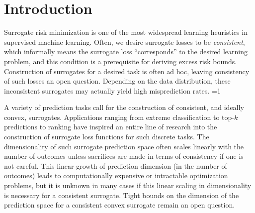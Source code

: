 \documentclass[anon,12pt]{colt2021} %
\newcommand{\Comments}{1}
\newcommand{\mynote}[2]{\ifnum\Comments=1\textcolor{#1}{#2}\fi}
\newcommand{\mytodo}[2]{\ifnum\Comments=1%
	\todo[linecolor=#1!80!black,backgroundcolor=#1,bordercolor=#1!80!black]{#2}\fi}
\newcommand{\jessie}[1]{\mynote{purple}{[JF: #1]}}
\newcommand{\jessiet}[1]{\mytodo{purple!20!white}{JF: #1}}
\begin{document}
\section{Introduction}\label{sec:intro}
Surrogate risk minimization is one of the most widespread learning heuristics in supervised machine learning.
Often, we desire surrogate losses to be \emph{consistent}, which informally means the surrogate loss ``corresponds'' to the desired learning problem, and this condition is a prerequisite for deriving excess risk bounds.
Construction of surrogates for a desired task is often ad hoc, leaving consistency of such losses an open question.
Depending on the data distribution, these inconsistent surrogates may actually yield high misprediction rates. \jessiet{Clean this up.}

A variety of prediction tasks call for the construction of consistent, and ideally convex, surrogates.
Applications ranging from extreme classification to top-$k$ predictions to ranking have inspired an entire line of research into the construction of surrogate loss functions for such discrete tasks.
The dimensionality of such surrogate prediction space often scales linearly with the number of outcomes unless sacrifices are made in terms of consistency if one is not careful.
This linear growth of prediction dimension (in the number of outcomes) leads to computationally expensive or intractable optimization problems, but it is unknown in many cases if this linear scaling in dimensionality is necessary for a consistent surrogate.
Tight bounds on the dimension of the prediction space for a consistent convex surrogate remain an open question.
\end{document}
